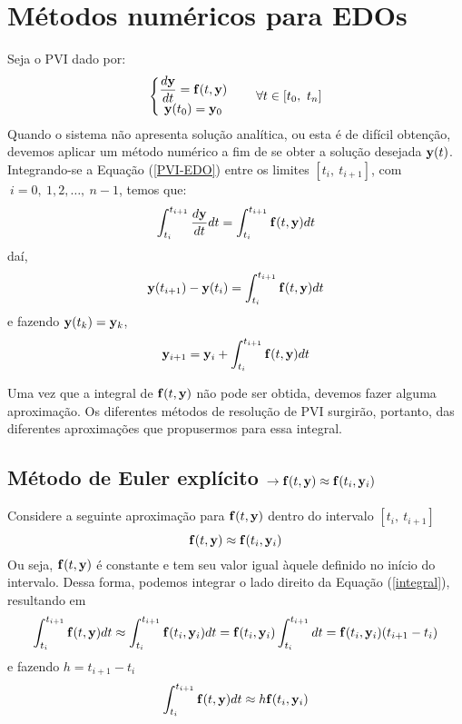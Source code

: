 \documentclass[12pt]{peqdoc}
\begin{document}
	\section{Métodos numéricos para EDOs}
	
	Seja o PVI dado por:
	\begin{equation}
	\left\{\begin{matrix}
	\displaystyle\frac{d\*y}{dt} = \*f(t,\*y) & \\ \*y(t_0) = \*y_0 &  
	\end{matrix}\right.\quad \forall t\in[t_0,\ t_n]\label{PVI-EDO}
	\end{equation}
	\noindent Quando o sistema não apresenta solução analítica, ou esta é de difícil obtenção, devemos aplicar um método numérico a fim de se obter a solução desejada $\mathbf{y}(t)$. Integrando-se a Equação (\ref{PVI-EDO}) entre os limites $[t_i,\ t_{i+1}]$, com $\ i = 0,\ 1, 2,\ldots,\ n-1$, temos que:
	\begin{equation}
	\int_{t_i}^{t_{i+1}}{\frac{d\mathbf{y}}{dt}dt} = \int_{t_i}^{t_{i+1}}{\mathbf{f}(t,\mathbf{y})dt}\label{integral}
	\end{equation}
	\noindent daí,
	\begin{equation}
	\mathbf{y}(t_{i+1}) - \mathbf{y}(t_i) = \int_{t_i}^{t_{i+1}}{\mathbf{f}(t,\mathbf{y})dt}
	\end{equation}
	\noindent e fazendo $\mathbf{y}(t_{k}) = \mathbf{y}_{k}$,
	\begin{equation}
	\mathbf{y}_{i+1} = \mathbf{y}_i + \int_{t_i}^{t_{i+1}}{\mathbf{f}(t,\mathbf{y})dt}\label{partida}
	\end{equation}
	
	Uma vez que a integral de $\mathbf{f}(t,\mathbf{y})$ não pode ser obtida, devemos fazer alguma aproximação. Os diferentes métodos de resolução de PVI surgirão, portanto, das diferentes aproximações que propusermos para essa integral.
	
	\subsection{Método de Euler explícito $\rightarrow\mathbf{f}(t,\mathbf{y})\approx \mathbf{f}(t_i,\mathbf{y}_i)$}
	
	Considere a seguinte aproximação para $\mathbf{f}(t,\mathbf{y})$ dentro do intervalo $[t_i,\ t_{i+1}]$
	\begin{equation}
	\mathbf{f}(t,\mathbf{y})\approx \mathbf{f}(t_i,\mathbf{y}_i)
	\end{equation}
	\noindent Ou seja, $\mathbf{f}(t,\mathbf{y})$ é constante e tem seu valor igual àquele definido no início do intervalo. Dessa forma, podemos integrar o lado direito da Equação (\ref{integral}), resultando em
	\begin{equation}
	\int_{t_i}^{t_{i+1}}{\mathbf{f}(t,\mathbf{y})dt} \approx \int_{t_i}^{t_{i+1}}{\mathbf{f}(t_i,\mathbf{y}_i)dt} = \mathbf{f}(t_i,\mathbf{y}_i)\int_{t_i}^{t_{i+1}}{dt} = \mathbf{f}(t_i,\mathbf{y}_i)(t_{i+1}-t_i)
	\end{equation}
	\noindent e fazendo $h=t_{i+1} - t_i$
	\begin{equation}
	\int_{t_i}^{t_{i+1}}{\mathbf{f}(t,\mathbf{y})dt} \approx h\mathbf{f}(t_i,\mathbf{y}_i)\label{int_EE}
	\end{equation}
	
\end{document}
